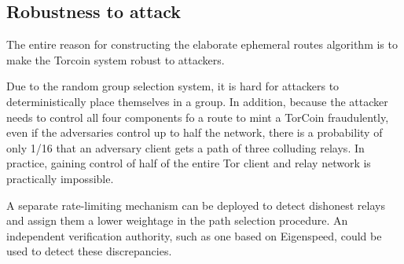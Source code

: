 \subsection{Robustness to attack}
The entire reason for constructing the elaborate ephemeral routes algorithm is to make the Torcoin system robust to attackers.

Due to the random group selection system, it is hard for attackers to deterministically place themselves in a group. In addition, because the attacker needs to control all four components fo a route to mint a TorCoin fraudulently, even if the adversaries control up to half the network, there is a probability of only 1/16 that an adversary client gets a path of three colluding relays. In practice, gaining control of half of the entire Tor client and relay network is practically impossible. 

A separate rate-limiting mechanism can be deployed to detect dishonest relays and assign them a lower weightage in the path selection procedure. An independent verification authority, such as one based on Eigenspeed, could be used to detect these discrepancies.